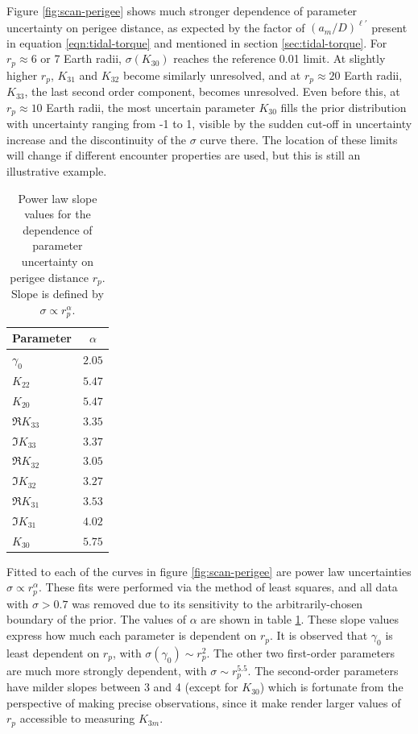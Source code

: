 \documentclass[fleqn,usenatbib]{mnras}
\begin{document}
Figure \ref{fig:scan-perigee} shows much stronger dependence of parameter uncertainty on perigee distance, as expected by the factor of $(a_m/D)^{\ell'}$ present in equation \ref{eqn:tidal-torque} and mentioned in section \ref{sec:tidal-torque}. For $r_p \approx 6$ or 7 Earth radii, $\sigma(K_{30})$ reaches the reference 0.01 limit. At slightly higher $r_p$, $K_{31}$ and $K_{32}$ become similarly unresolved, and at $r_p \approx 20$ Earth radii, $K_{33}$, the last second order component, becomes unresolved. Even before this, at $r_p \approx 10$ Earth radii, the most uncertain parameter $K_{30}$ fills the prior distribution with uncertainty ranging from -1 to 1, visible by the sudden cut-off in uncertainty increase and the discontinuity of the $\sigma$ curve there. The location of these limits will change if different encounter properties are used, but this is still an illustrative example.

\begin{table}
  \centering
  \begin{tabular}{l|c}
    \hline
    Parameter & $\alpha$ \\ \hline
    $\gamma_0$ & $2.05$ \\
    $K_{22}$ & $5.47$ \\
    $K_{20}$ & $5.47$ \\ \hline
    $\Re K_{33}$ & $3.35$ \\
    $\Im K_{33}$ & $3.37$ \\
    $\Re K_{32}$ & $3.05$ \\
    $\Im K_{32}$ & $3.27$ \\
    $\Re K_{31}$ & $3.53$ \\
    $\Im K_{31}$ & $4.02$ \\
    $K_{30}$ & $5.75$ \\ \hline
  \end{tabular}
  \caption{Power law slope values for the dependence of parameter uncertainty on perigee distance $r_p$. Slope is defined by $\sigma \propto r_p^\alpha$.}
  \label{tab:scan-perigee-alpha}
\end{table}

Fitted to each of the curves in figure \ref{fig:scan-perigee} are power law uncertainties $\sigma \propto r_p^\alpha$. These fits were performed via the method of least squares, and all data with $\sigma > 0.7$ was removed due to its sensitivity to the arbitrarily-chosen boundary of the prior. The values of $\alpha$ are shown in table \ref{tab:scan-perigee-alpha}. These slope values express how much each parameter is dependent on $r_p$. It is observed that $\gamma_0$ is least dependent on $r_p$, with $\sigma(\gamma_0) \sim r_p^2$. The other two first-order parameters are much more strongly dependent, with $\sigma \sim r_p^{5.5}$. The second-order parameters have milder slopes between 3 and 4 (except for $K_{30}$) which is fortunate from the perspective of making precise observations, since it make render larger values of $r_p$ accessible to measuring $K_{3m}$.
\end{document}
